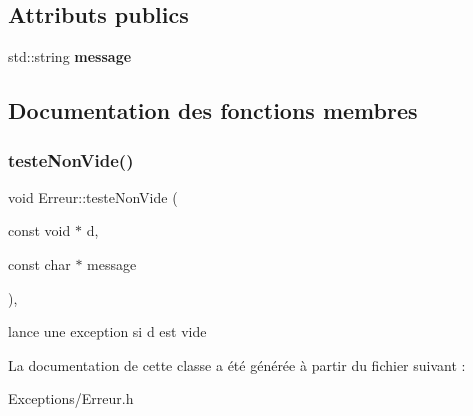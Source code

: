 \subsection*{Attributs publics}
\begin{DoxyCompactItemize}
\item 
\mbox{\label{class_erreur_ab40f3a7406b1c80742c1d8a2744f959b}} 
std\+::string {\bfseries message}
\end{DoxyCompactItemize}


\subsection{Documentation des fonctions membres}
\mbox{\label{class_erreur_ad318a27a06c5c1f68506eb00b9fe6beb}} 
\subsubsection{\texorpdfstring{testeNonVide()}{testeNonVide()}}
{\footnotesize\ttfamily void Erreur\+::teste\+Non\+Vide (\begin{DoxyParamCaption}\item[{const void $\ast$}]{d,  }\item[{const char $\ast$}]{message }\end{DoxyParamCaption})\hspace{0.3cm}{\ttfamily [inline]}, {\ttfamily [static]}}

lance une exception si d est vide 

La documentation de cette classe a été générée à partir du fichier suivant \+:\begin{DoxyCompactItemize}
\item 
Exceptions/Erreur.\+h\end{DoxyCompactItemize}
